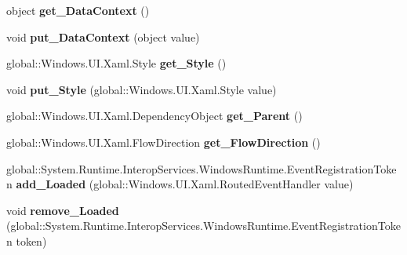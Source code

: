 \begin{DoxyCompactItemize}
object {\bfseries get\+\_\+\+Data\+Context} ()
\item 
\mbox{\label{interface_windows_1_1_u_i_1_1_xaml_1_1_i_framework_element_a61847908f27c9feb7e9307fccd243aa7}} 
void {\bfseries put\+\_\+\+Data\+Context} (object value)
\item 
\mbox{\label{interface_windows_1_1_u_i_1_1_xaml_1_1_i_framework_element_a8acb2f4d3cfe85560c75cdba3730e2dc}} 
global\+::\+Windows.\+U\+I.\+Xaml.\+Style {\bfseries get\+\_\+\+Style} ()
\item 
\mbox{\label{interface_windows_1_1_u_i_1_1_xaml_1_1_i_framework_element_ab113b23a88312132f12dd7ff37c23fc2}} 
void {\bfseries put\+\_\+\+Style} (global\+::\+Windows.\+U\+I.\+Xaml.\+Style value)
\item 
\mbox{\label{interface_windows_1_1_u_i_1_1_xaml_1_1_i_framework_element_a109f23b5d4ff91a61e010793e8f75ef6}} 
global\+::\+Windows.\+U\+I.\+Xaml.\+Dependency\+Object {\bfseries get\+\_\+\+Parent} ()
\item 
\mbox{\label{interface_windows_1_1_u_i_1_1_xaml_1_1_i_framework_element_a80c91718f267bfd344d25ca8701827ab}} 
global\+::\+Windows.\+U\+I.\+Xaml.\+Flow\+Direction {\bfseries get\+\_\+\+Flow\+Direction} ()
\item 
\mbox{\label{interface_windows_1_1_u_i_1_1_xaml_1_1_i_framework_element_a09af92bc5fcaa9a8925401ddcd75d36e}} 
global\+::\+System.\+Runtime.\+Interop\+Services.\+Windows\+Runtime.\+Event\+Registration\+Token {\bfseries add\+\_\+\+Loaded} (global\+::\+Windows.\+U\+I.\+Xaml.\+Routed\+Event\+Handler value)
\item 
\mbox{\label{interface_windows_1_1_u_i_1_1_xaml_1_1_i_framework_element_aafdb3efaeb2c040c7e5209bb37317e74}} 
void {\bfseries remove\+\_\+\+Loaded} (global\+::\+System.\+Runtime.\+Interop\+Services.\+Windows\+Runtime.\+Event\+Registration\+Token token)

\end{DoxyCompactItemize}
